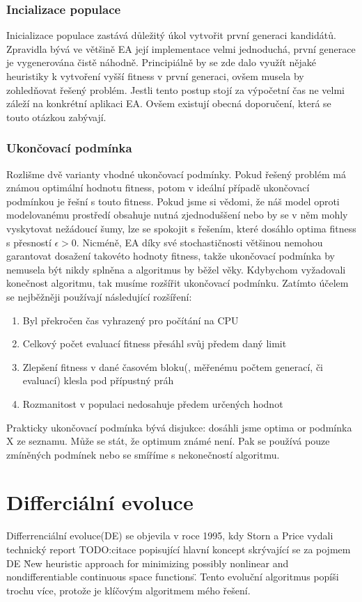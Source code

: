 \subsubsection{Incializace populace}
Inicializace populace zastává důležitý úkol vytvořit první generaci kandidátů. Zpravidla bývá ve většině EA její implementace velmi jednoduchá, první generace je vygenerována čistě náhodně. Principiálně by se zde dalo využít nějaké heuristiky k vytvoření vyšší fitness v první generaci, ovšem musela by zohledňovat řešený problém. Jestli tento postup stojí za výpočetní čas ne velmi záleží na konkrétní aplikaci EA. Ovšem existují obecná doporučení, která se touto otázkou zabývají. 
\subsubsection{Ukončovací podmínka}
Rozlišme dvě varianty vhodné ukončovací podmínky. Pokud řešený problém má známou optimální hodnotu fitness, potom v ideální případě ukončovací podmínkou je řešní s touto fitness. Pokud jsme si vědomi, že náš model oproti modelovanému prostředí obsahuje nutná zjednoduššení nebo by se v něm mohly vyskytovat nežádoucí šumy, lze se spokojit s řešením, které dosáhlo optima fitness s přesností $\epsilon > 0$. Nicméně, EA díky své stochastičnosti většinou nemohou garantovat dosažení takovéto hodnoty fitness, takže ukončovací podmínka by nemusela být nikdy splněna a algoritmus by běžel věky. Kdybychom vyžadovali konečnost algoritmu, tak musíme rozšířit ukončovací podmínku. Zatímto účelem se nejběžněji používají následující rozšíření: \par
\begin{enumerate}
\item Byl překročen čas vyhrazený pro počítání na CPU
\item Celkový počet evaluací fitness přesáhl svůj předem daný limit 
\item Zlepšení fitness v dané časovém bloku(, měřenému počtem generací, či evaluací) klesla pod přípustný práh
\item Rozmanitost v populaci nedosahuje předem určených hodnot
\end{enumerate}
Prakticky ukončovací podmínka bývá disjukce: dosáhli jsme optima or podmínka X ze seznamu. Může se stát, že optimum známé není. Pak se používá pouze zmíněných podmínek nebo se smíříme s nekonečností algoritmu. 
\section{Differciální evoluce}
Differrenciální evoluce(DE) se objevila v roce 1995, kdy Storn a Price vydali technický report TODO:citace popisující hlavní koncept skrývající se za pojmem DE \"New heuristic approach for minimizing possibly nonlinear and nondifferentiable continuous space functions\". Tento evoluční algoritmus popíši trochu více, protože je klíčovým algoritmem mého řešení. 
